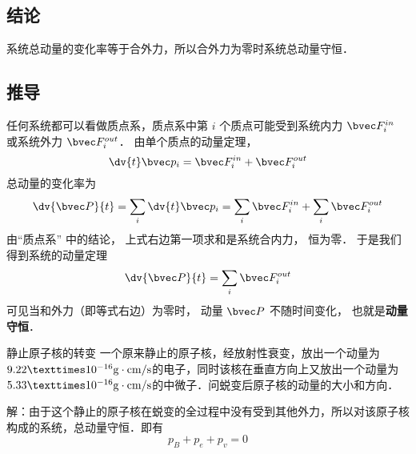 \subsection{结论}
系统总动量的变化率等于合外力，所以合外力为零时系统总动量守恒．

\subsection{推导}
任何系统都可以看做质点系，质点系中第 $i$ 个质点可能受到系统内力 $\bvec F_i^{in}$ 或系统外力 $\bvec F_i^{out}$． 由单个质点的动量定理，
\begin{equation}
\dv{t} \bvec p_i = \bvec F_i^{in} + \bvec F_i^{out}
\end{equation}
总动量的变化率为
\begin{equation}
\dv{\bvec P}{t} = \sum_i \dv{t} \bvec p_i  = \sum_i \bvec F_i^{in}  + \sum_i \bvec F_i^{out}
\end{equation}
由“质点系” 中的结论， 上式右边第一项求和是系统合内力， 恒为零． 于是我们得到系统的动量定理
\begin{equation}
\dv{\bvec P}{t} = \sum_i \bvec F_i^{out}
\end{equation}
可见当和外力（即等式右边）为零时， 动量 $\bvec P$ 不随时间变化， 也就是\textbf{动量守恒}．

\begin{example}{静止原子核的转变}
一个原来静止的原子核，经放射性衰变，放出一个动量为$9.22×10^{-16}{\rm g\cdot cm/s}$的电子，同时该核在垂直方向上又放出一个动量为$5.33×10^{-16}{\rm g\cdot cm/s}$的中微子．问蜕变后原子核的动量的大小和方向．

解：由于这个静止的原子核在蜕变的全过程中没有受到其他外力，所以对该原子核构成的系统，总动量守恒．即有
\begin{equation}
p_{B}+p_{e}+p_{v}=0
\end{equation}
\end{example}
